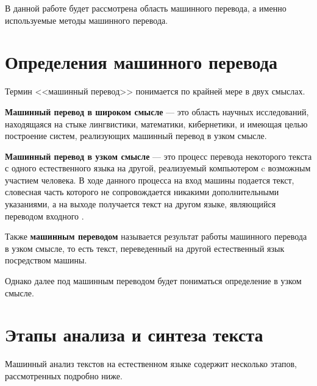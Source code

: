 В данной работе будет рассмотрена область машинного перевода, а именно используемые методы машинного перевода.

\section{Определения машинного перевода}

Термин <<машинный перевод>> понимается по крайней мере в двух смыслах. 

\textbf{Машинный перевод в широком смысле} --- это область научных исследований, находящаяся на стыке лингвистики, математики, кибернетики, и имеющая целью построение систем, реализующих машинный перевод в узком смысле.

\textbf{Машинный перевод в узком смысле} --- это процесс перевода некоторого текста с одного естественного языка на другой, реализуемый компьютером c возможным участием человека. В ходе данного процесса на вход машины подается текст, словесная часть которого не сопровождается никакими дополнительными указаниями, а на выходе получается текст на другом языке, являющийся переводом входного \cite{voronovich}.

Также \textbf{машинным переводом} называется результат работы машинного перевода в узком смысле, то есть текст, переведенный на другой естественный язык посредством машины.

Однако далее под машинным переводом будет пониматься определение в узком смысле.

\section{Этапы анализа и синтеза текста}

Машинный анализ текстов на естественном языке содержит несколько этапов, рассмотренных подробно ниже.

